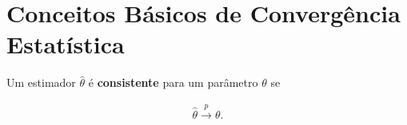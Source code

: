\documentclass[11pt,oneside,a4paper]{article}
\numberwithin{equation}{section}
\begin{document}
\begin{def1}
\end{def1}

\begin{def1}
\end{def1}

\begin{def1}[]
\end{def1}

\begin{def1}
\end{def1}

\begin{def1}[]
\end{def1}

\begin{def1}[]
\end{def1}

\clearpage
\section*{Conceitos Básicos de Convergência Estatística}

\begin{def1}
Um estimador $\hat{\theta}$ é \textbf{consistente} para um parâmetro $\theta$ se 

\vspace{-1 em}
\begin{align*}
\hat{\theta} \overset{p}{\longrightarrow} \theta.
\end{align*}
\end{def1}
\end{document}
